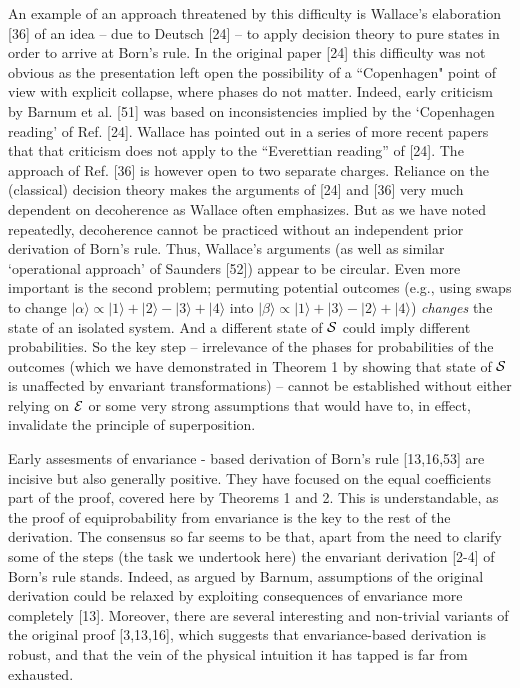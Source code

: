 \documentclass[aps,twocolumn,pra,epsfig]{revtex4}
\begin{document}
An example of an approach threatened by this difficulty is Wallace's
elaboration [36] of an idea -- due to Deutsch [24] -- to apply decision
theory to pure states in order to arrive at Born's rule. In the original
paper [24] this difficulty was not obvious as the presentation left open the
possibility of a ``Copenhagen" point of view with explicit collapse, where
phases do not matter. Indeed, early criticism by Barnum et al. [51] was based
on inconsistencies implied by the `Copenhagen reading' of Ref. [24]. Wallace
has pointed out in a series of more recent papers that that criticism does not
apply to the ``Everettian reading'' of [24]. The approach of Ref. [36]
is however open to two separate charges. Reliance on the (classical) decision
theory makes the arguments of [24] and [36] very much dependent on decoherence
as Wallace often emphasizes. But as we have noted repeatedly, decoherence
cannot be practiced without an independent prior derivation of Born's rule.
Thus, Wallace's arguments (as well as similar `operational approach' of
Saunders [52]) appear to be circular. Even more important is the second
problem; permuting potential outcomes (e.g., using swaps to change
$|\alpha\rangle \propto |1\rangle +|2\rangle-|3\rangle+|4\rangle$ into
$|\beta\rangle \propto |1\rangle +|3\rangle-|2\rangle+|4\rangle$) {\it changes}
the state of an isolated system. And a different state of ${\cal S}$ could
imply different probabilities. So the key step -- irrelevance of the phases for
probabilities of the outcomes (which we have demonstrated in Theorem 1 by
showing that state of ${\cal S}$ is unaffected by envariant transformations)
-- cannot be established without either relying on ${\cal E}$ or some very
strong assumptions that would have to, in effect, invalidate the principle of
superposition.

Early assesments of envariance - based derivation of Born's rule [13,16,53]
are incisive but also generally positive. They have focused on 
the equal coefficients part of the proof, covered here by Theorems 1 and 2. 
This is understandable, as the proof of equiprobability from envariance
is  the key to the rest of the derivation. The consensus so far seems to be
that, apart from the need to clarify some of the steps (the task we undertook 
here) the envariant derivation [2-4] of Born's rule stands.
Indeed, as argued by Barnum, assumptions of the original derivation could be
relaxed by exploiting consequences of envariance more completely [13].
Moreover, there are several interesting and non-trivial variants of the original
proof [3,13,16], which suggests that envariance-based derivation is robust,
and that the vein of the physical intuition it has tapped is far from exhausted.
\end{document}
